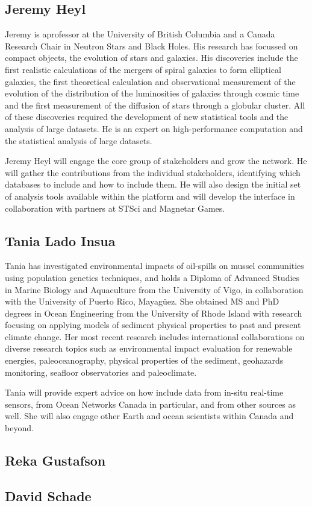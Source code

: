 \subsection*{Jeremy Heyl}
Jeremy is aprofessor at the University of British Columbia and a
Canada Research Chair in Neutron Stars and Black Holes.  His research
has focussed on compact objects, the evolution of stars and galaxies.
His discoveries include the first realistic calculations of the
mergers of spiral galaxies to form elliptical galaxies, the first
theoretical calculation and observational measurement of the evolution
of the distribution of the luminosities of galaxies through cosmic
time and the first measurement of the diffusion of stars through a
globular cluster.  All of these discoveries required the development
of new statistical tools and the analysis of large datasets. He is an
expert on high-performance computation and the statistical analysis of
large datasets.

Jeremy Heyl will engage the core group of stakeholders and grow the
network.  He will gather the contributions from the individual
stakeholders, identifying which databases to include and how to
include them.  He will also design the initial set of analysis tools
available within the platform and will develop the interface in
collaboration with partners at STSci and Magnetar Games.

\subsection*{Tania Lado Insua}

Tania has investigated environmental impacts of oil-spills on mussel
communities using population genetics techniques, and holds a Diploma
of Advanced Studies in Marine Biology and Aquaculture from the
University of Vigo, in collaboration with the University of Puerto
Rico, Mayagüez.  She obtained MS and PhD degrees in Ocean Engineering
from the University of Rhode Island with research focusing on applying
models of sediment physical properties to past and present climate
change. Her most recent research includes international collaborations
on diverse research topics such as environmental impact evaluation for
renewable energies, paleoceanography, physical properties of the
sediment, geohazards monitoring, seafloor observatories and
paleoclimate.

Tania will provide expert advice on how include data from in-situ
real-time sensors, from Ocean Networks Canada in particular, and from
other sources as well.  She will also engage other Earth and ocean
scientists within Canada and beyond.

\subsection*{Reka Gustafson}


\subsection*{David Schade}



